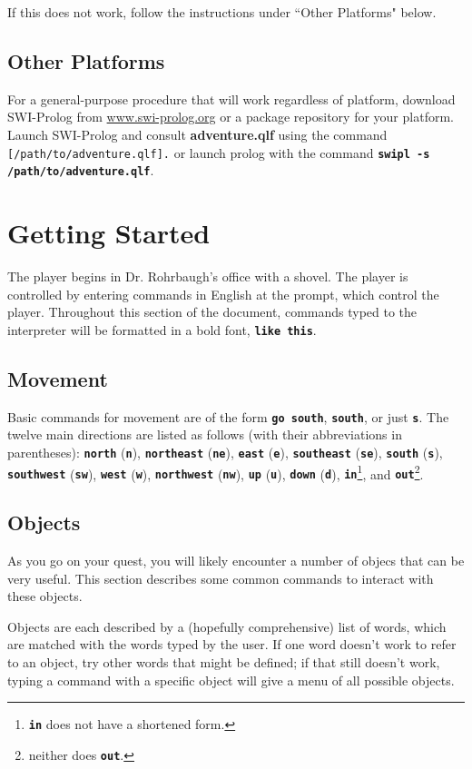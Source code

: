\documentclass{report}
\begin{document}
If this does not work, follow the instructions under ``Other Platforms" below.

\section{Other Platforms}
For a general-purpose procedure that will work regardless of platform, download SWI-Prolog from \url{www.swi-prolog.org} or a package repository for your platform. Launch SWI-Prolog and consult {\bf adventure.qlf} using the command {\tt [\textquotesingle /path/to/adventure.qlf\textquotesingle].} or launch prolog with the command {\tt \bf swipl -s /path/to/adventure.qlf}.

\chapter{Getting Started}
The player begins in Dr. Rohrbaugh's office with a shovel. The player is controlled by entering commands in English at the prompt, which control the player. Throughout this section of the document, commands typed to the interpreter will be formatted in a bold font, {\tt \bf like this}.

\section{Movement}
Basic commands for movement are of the form {\tt \bf go south}, {\tt \bf south}, or just {\tt \bf s}. The twelve main directions are listed as follows (with their abbreviations in parentheses): {\tt \bf north} ({\tt \bf n}), {\tt \bf northeast} ({\tt \bf ne}), {\tt \bf east} ({\tt \bf e}), {\tt \bf southeast} ({\tt \bf se}), {\tt \bf south} ({\tt \bf s}), {\tt \bf southwest} ({\tt \bf sw}), {\tt \bf west} ({\tt \bf w}), {\tt \bf northwest} ({\tt \bf nw}), {\tt \bf up} ({\tt \bf u}), {\tt \bf down} ({\tt \bf d}), {\tt \bf in}\footnote{{\tt \bf in} does not have a shortened form.}, and {\tt \bf out}\footnote{neither does {\tt \bf out}.}.

\section{Objects}
As you go on your quest, you will likely encounter a number of objecs that can be very useful. This section describes some common commands to interact with these objects.

Objects are each described by a (hopefully comprehensive) list of words, which are matched with the words typed by the user. If one word doesn't work to refer to an object, try other words that might be defined; if that still doesn't work, typing a command with a specific object will give a menu of all possible objects.
\end{document}
